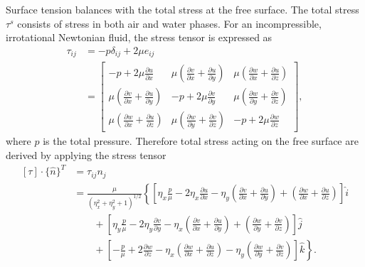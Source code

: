 Surface tension balances with the total stress at the free surface. The total stress $\tau^s$ consists of stress in both air and water phases. For an incompressible, irrotational Newtonian fluid, the stress tensor is expressed as
\begin{equation}
    \begin{split}
    \tau _{ij} &=-p\delta _{ij} +2\mu e_{ij} \\&=
        \begin{bmatrix}
         -p+2\mu \frac{\partial u}{\partial x} & \mu \left(\frac{\partial v}{\partial x} +\frac{\partial u}{\partial y}\right) & \mu \left(\frac{\partial w}{\partial x} +\frac{\partial u}{\partial z}\right)\\
        \mu \left(\frac{\partial v}{\partial x} +\frac{\partial u}{\partial y}\right) & -p+2\mu \frac{\partial v}{\partial y} & \mu \left(\frac{\partial w}{\partial y} +\frac{\partial v}{\partial z}\right)\\
        \mu \left(\frac{\partial w}{\partial x} +\frac{\partial u}{\partial z}\right) & \mu \left(\frac{\partial w}{\partial y} +\frac{\partial v}{\partial z}\right) & -p+2\mu \frac{\partial w}{\partial z}
        \end{bmatrix},
    \end{split}
\end{equation}
where $p$ is the total pressure. Therefore total stress acting on the free surface are derived by applying the stress tensor
\begin{equation}
\begin{split}
    [ \tau ] \cdot \{\hat{n}\}^T &=\tau _{ij} n_{j} \\&= {\displaystyle \frac{\mu }{\left( \eta _{x}^{2} +\eta _{y}^{2} +1\right)^{1/2}}}\left\{{\displaystyle \left[ \eta _{x}\frac{p}{\mu } -2\eta _{x}\frac{\partial u}{\partial x} -\eta _{y}\left(\frac{\partial v}{\partial x} +\frac{\partial u}{\partial y}\right) +\left(\frac{\partial w}{\partial x} +\frac{\partial u}{\partial z}\right)\right]}\hat{i} \right.\\
    & \qquad+{\displaystyle \left[ \eta _{y}\frac{p}{\mu } -2\eta _{y}\frac{\partial v}{\partial y} -\eta _{x}\left(\frac{\partial v}{\partial x} +\frac{\partial u}{\partial y}\right) +\left(\frac{\partial w}{\partial y} +\frac{\partial v}{\partial z}\right)\right]}\hat{j} \\
    &\qquad+\left.{\displaystyle \left[ -\frac{p}{\mu } +2\frac{\partial w}{\partial z} -\eta _{x}\left(\frac{\partial w}{\partial x} +\frac{\partial u}{\partial z}\right) -\eta _{y}\left(\frac{\partial w}{\partial y} +\frac{\partial v}{\partial z}\right)\right]\hat{k}}\right\}.
\end{split}
\label{eq:tau}
\end{equation}

